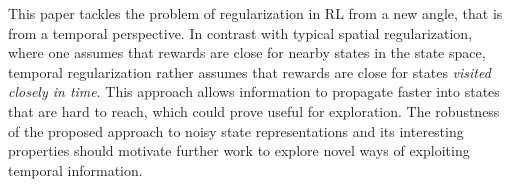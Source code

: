 This paper tackles the problem of regularization in RL from a new angle, that is from a temporal perspective. In contrast with typical spatial regularization, where one assumes that rewards are close for nearby states in the state space, temporal regularization rather assumes that rewards are close for states \emph{visited closely in time}. This approach allows information to propagate faster into states that are hard to reach, which could prove useful for exploration. The robustness of the proposed approach to noisy state representations and its interesting properties should motivate further work to explore novel ways of exploiting temporal information.